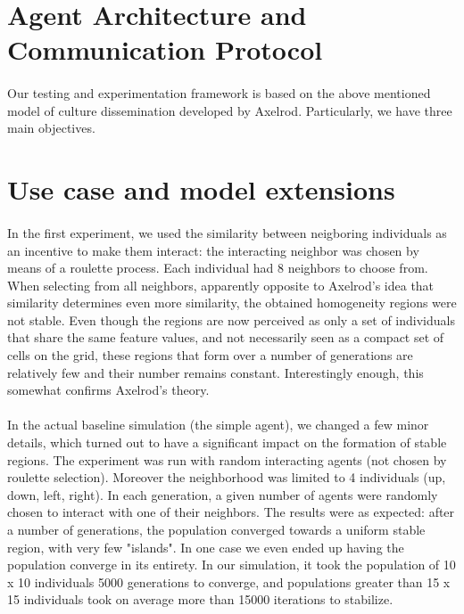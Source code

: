 \documentclass[twoside, 11pt, a4paper]{article}
\begin{document}
\section{Agent Architecture and Communication Protocol}

\paragraph*{}Our testing and experimentation framework is based on the above mentioned model of culture dissemination developed by Axelrod. Particularly, we have three main objectives.


\section{Use case and model extensions}


\paragraph*{}In the first experiment, we used the similarity between neigboring individuals as an incentive to make them interact: the interacting neighbor was chosen by means of a roulette process. Each individual had 8 neighbors to choose from. When selecting from all neighbors, apparently opposite to Axelrod's idea that similarity determines even more similarity, the obtained homogeneity regions were not stable. Even though the regions are now perceived as only a set of individuals that share the same feature values, and not necessarily seen as a compact set of cells on the grid, these regions that form over a number of generations are relatively few and their number remains constant. Interestingly enough, this somewhat confirms Axelrod's theory.

\paragraph*{}In the actual baseline simulation (the simple agent), we changed a few minor details, which turned out to have a significant impact on the formation of stable regions. The experiment was run with random interacting agents (not chosen by roulette selection). Moreover the neighborhood was limited to 4 individuals (up, down, left, right). In each generation, a given number of agents were randomly chosen to interact with one of their neighbors. The results were as expected: after a number of generations, the population converged towards a uniform stable region, with very few "islands". In one case we even ended up having the population converge in its entirety. In our simulation, it took the population of 10 x 10 individuals 5000 generations to converge, and populations greater than 15 x 15 individuals took on average more than 15000 iterations to stabilize.
\end{document}
